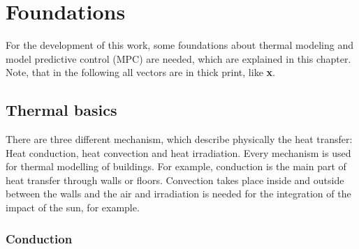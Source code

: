 \chapter{Foundations}
\label{ch:foundations}

For the development of this work, some foundations about thermal modeling and model predictive control (MPC) are needed, which are explained in this chapter. Note, that in the following all vectors are in thick print, like \textbf{x}.

\section{Thermal basics}
\label{section:thermalbasics}

There are three different mechanism, which describe physically the heat transfer: Heat conduction, heat convection and heat irradiation\cite{.2013}. Every mechanism is used for thermal modelling of buildings. For example, conduction is the main part of heat transfer through walls or floors. Convection takes place inside and outside between the walls and the air and irradiation is needed for the integration of the impact of the sun, for example.

\subsection{Conduction}
\label{subsection:conduction}


